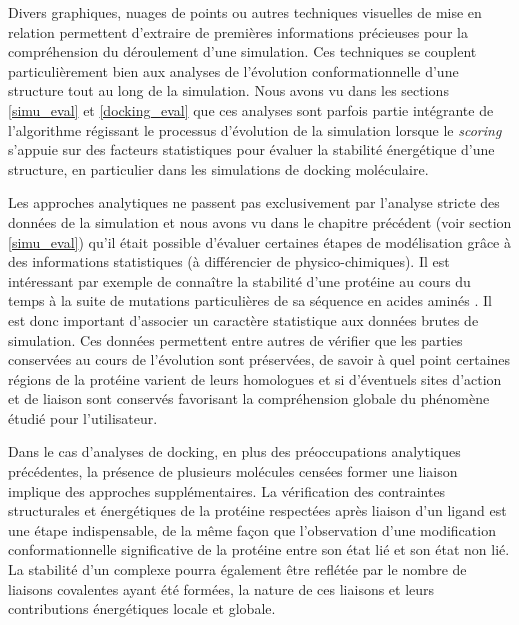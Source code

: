 
Divers graphiques, nuages de points ou autres techniques visuelles de mise en relation permettent d'extraire de premières informations précieuses pour la compréhension du déroulement d'une simulation. Ces techniques se couplent particulièrement bien aux analyses de l'évolution conformationnelle d'une structure tout au long de la simulation. Nous avons vu dans les sections \ref{simu_eval} et \ref{docking_eval} que ces analyses sont parfois partie intégrante de l'algorithme régissant le processus d'évolution de la simulation lorsque le \textit{scoring} s'appuie sur des facteurs statistiques pour évaluer la stabilité énergétique d'une structure, en particulier dans les simulations de docking moléculaire.

Les approches analytiques ne passent pas exclusivement par l'analyse stricte des données de la simulation et nous avons vu dans le chapitre précédent (voir section \ref{simu_eval}) qu'il était possible d'évaluer certaines étapes de modélisation grâce à des informations statistiques (à différencier de physico-chimiques). Il est intéressant par exemple de connaître la stabilité d'une protéine au cours du temps à la suite de mutations particulières de sa séquence en acides aminés \cite{masso2008accurate}. Il est donc important d'associer un caractère statistique aux données brutes de simulation. Ces données permettent entre autres de vérifier que les parties conservées au cours de l'évolution sont préservées, de savoir à quel point certaines régions de la protéine varient de leurs homologues et si d'éventuels sites d'action et de liaison sont conservés favorisant la compréhension globale du phénomène étudié pour l'utilisateur.

Dans le cas d'analyses de docking, en plus des préoccupations analytiques précédentes, la présence de plusieurs molécules censées former une liaison implique des approches supplémentaires. La vérification des contraintes structurales et énergétiques de la protéine respectées après liaison d'un ligand est une étape indispensable, de la même façon que l'observation d'une modification conformationnelle significative de la protéine entre son état lié et son état non lié. La stabilité d'un complexe pourra également être reflétée par le nombre de liaisons covalentes ayant été formées, la nature de ces liaisons et leurs contributions énergétiques locale et globale.

